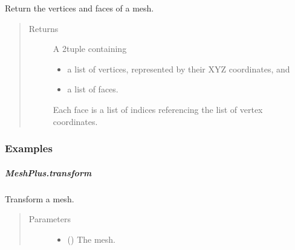 \documentclass[letterpaper,10pt,english]{sphinxmanual}
\begin{document}
\begin{fulllineitems}
\begin{fulllineitems}
\label{\detokenize{api/generated/directional_clustering.mesh.MeshPlus.to_vertices_and_faces:directional_clustering.mesh.MeshPlus.to_vertices_and_faces}}
Return the vertices and faces of a mesh.
\begin{quote}\begin{description}
\item[{Returns}] \leavevmode

 \textendash{} A 2\sphinxhyphen{}tuple containing
\begin{itemize}
\item {} 
a list of vertices, represented by their XYZ coordinates, and

\item {} 
a list of faces.

\end{itemize}

Each face is a list of indices referencing the list of vertex coordinates.


\end{description}\end{quote}
\subsubsection*{Examples}

\begin{sphinxVerbatim}[commandchars=\\\{\}]
\end{sphinxVerbatim}

\end{fulllineitems}



\subparagraph{MeshPlus.transform}
\label{\detokenize{api/generated/directional_clustering.mesh.MeshPlus.transform:meshplus-transform}}\label{\detokenize{api/generated/directional_clustering.mesh.MeshPlus.transform::doc}}

\begin{fulllineitems}
\label{\detokenize{api/generated/directional_clustering.mesh.MeshPlus.transform:directional_clustering.mesh.MeshPlus.transform}}
Transform a mesh.
\begin{quote}\begin{description}
\item[{Parameters}] \leavevmode\begin{itemize}
\item {} 
 () \textendash{} The mesh.


\end{itemize}
\end{description}
\end{quote}
\end{fulllineitems}
\end{fulllineitems}
\end{document}
